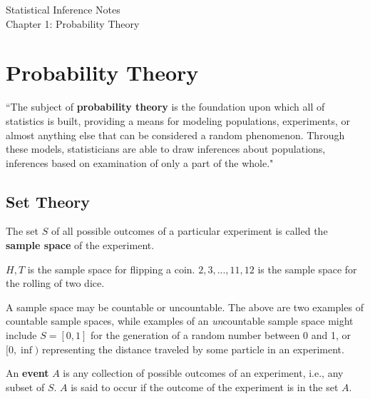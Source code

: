 


\begin{center}
    \LARGE {Statistical Inference Notes} \\
    \Large {Chapter 1: Probability Theory}
\end{center}
\bigskip

\tableofcontents


\newpage

\section*{Probability Theory}
``The subject of \textbf{probability theory} is the foundation upon which all of statistics is built, providing a means for modeling populations, experiments, or almost anything else that can be considered a random phenomenon. Through these models, statisticians are able to draw inferences about populations, inferences based on examination of only a part of the whole."
\bigskip


\subsection*{Set Theory}
\begin{definition}
    The set $S$ of all possible outcomes of a particular experiment is called the \textbf{sample space} of the experiment.
\end{definition}

\begin{example}
    ${H, T}$ is the sample space for flipping a coin.
    ${2, 3, ..., 11, 12}$ is the sample space for the rolling of two dice.
\end{example}

A sample space may be countable or uncountable. The above are two examples of countable sample spaces, while examples of an \textit{un}countable sample space might include $S = [0, 1]$ for the generation of a random number between 0 and 1, or $[0, \inf)$ representing the distance traveled by some particle in an experiment.
\nextp

\begin{definition}
    An \textbf{event} $A$ is any collection of possible outcomes of an experiment, i.e., any subset of $S$. $A$ is said to occur if the outcome of the experiment is in the set $A$.
\end{definition}

